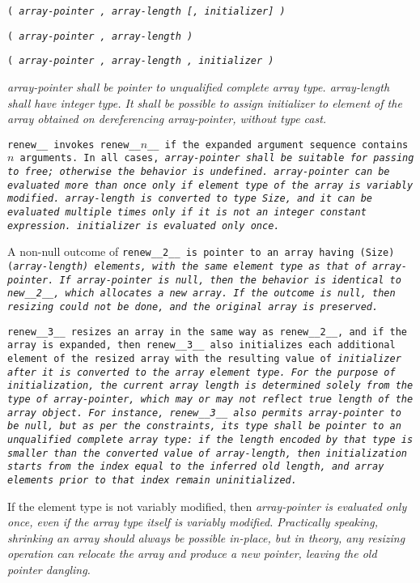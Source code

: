 
\s\s\s\s\tt{(} \it{array-pointer} \tt{,} \it{array-length}
[\tt{,} \it{initializer}] \tt{)}

\s\tt{(} \it{array-pointer} \tt{,} \it{array-length} \tt{)}

\s\tt{(} \it{array-pointer} \tt{,} \it{array-length}
\phantom{[}\tt{,} \it{initializer}\phantom{]} \tt{)}


\it{array-pointer} shall be pointer to unqualified complete array type.
\it{array-length} shall have integer type.
It shall be possible to assign \it{initializer} to element of the
array obtained on dereferencing \it{array-pointer}, without type cast.


\tt{renew__} invokes \tt{renew__}$n$\_\_ if the
expanded argument sequence contains $n$ arguments.
In all cases, \it{array-pointer} shall be suitable for passing to \tt{free};
otherwise the behavior is undefined.
\it{array-pointer} can be evaluated more than once
only if element type of the array is variably modified.
\it{array-length} is converted to type \tt{Size}, and it can be evaluated
multiple times only if it is not an integer constant expression.
\it{initializer} is evaluated only once.

A non-null outcome of \tt{renew__2__} is pointer to an
array having \tt{(Size)(}\it{array-length}\tt{)} elements,
with the same element type as that of \it{array-pointer}.
If \it{array-pointer} is null,
then the behavior is identical to \tt{new__2__}, which allocates a new array.
If the outcome is null,
then resizing could not be done, and the original array is preserved.

\tt{renew__3__} resizes an array in the same way as \tt{renew__2__},
and if the array is expanded, then \tt{renew__3__} also initializes
each additional element of the resized array with the resulting value
of \it{initializer} after it is converted to the array element type.
For the purpose of initialization, the current array length
is determined solely from the type of \it{array-pointer},
which may or may not reflect true length of the array object.
For instance, \tt{renew__3__} also permits \it{array-pointer} to be null, but as
per the constraints, its type shall be pointer to an unqualified complete array
type: if the length encoded by that type is smaller than the converted value of
\it{array-length}, then initialization starts from the index equal to the
inferred old length, and array elements prior to that index remain uninitialized.

\note If the element type is not variably modified, then \it{array-pointer}
is evaluated only once, even if the array type itself is variably modified.
Practically speaking, shrinking an array should always be possible in-place,
but in theory, any resizing operation can relocate the array
and produce a new pointer, leaving the old pointer dangling.
